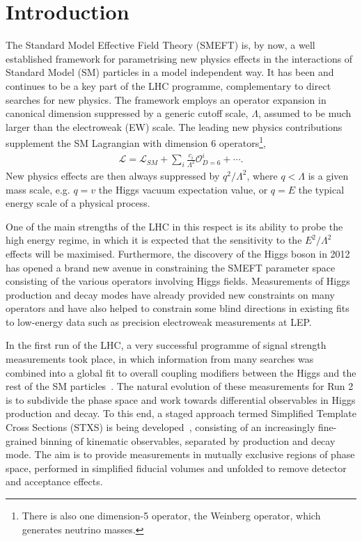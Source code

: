 \documentclass[11pt]{cernrep}
\begin{document}
\section{Introduction}
\label{sec:intro}
The Standard Model Effective Field Theory (SMEFT) is, by now, a well established framework for parametrising new physics effects in the interactions of Standard Model (SM) particles in a model independent way. It has been and continues to be a key part of the LHC programme, complementary to direct searches for new physics. The framework employs an operator expansion in canonical dimension suppressed by a generic cutoff scale, $\Lambda$, assumed to be much larger than the electroweak (EW) scale. The leading new physics contributions supplement the SM Lagrangian with dimension 6 operators\footnote{There is also one dimension-5 operator, the Weinberg operator, which generates neutrino masses.}, 
\begin{align}
    \mathcal{L}=\mathcal{L}_{SM}+\sum_i \frac{c_i}{\Lambda^2}\mathcal{O}^i_{D=6}+\cdots.
\end{align} 
New physics effects are then always suppressed by $q^2/\Lambda^2$, where $q<\Lambda$ is a given mass scale, e.g. $q=v$ the Higgs vacuum expectation value, or $q=E$ the typical energy scale of a physical process.

One of the main strengths of the LHC in this respect is its ability to probe the high energy regime, 
in which it is expected that the sensitivity to the $E^2/\Lambda^2$ effects will be maximised. Furthermore, the discovery of the Higgs boson in 2012~\cite{Aad:2012tfa,Chatrchyan:2012xdj} has opened a brand new avenue in constraining the SMEFT parameter space consisting of the various operators involving Higgs fields. Measurements of Higgs production and decay modes have already provided new constraints on many operators and have also helped to constrain some blind directions in existing fits to low-energy data such as precision electroweak measurements at LEP. 

In the first run of the LHC, a very successful programme of signal strength measurements took place, in which information from many searches was combined into a global fit to overall coupling modifiers between the Higgs and the rest of the SM particles~\cite{Khachatryan:2016vau}. The natural evolution of these measurements for Run 2 is to subdivide the phase space and work towards differential observables in Higgs production and decay. To this end, a staged approach termed Simplified Template Cross Sections (STXS) is being developed~\cite{deFlorian:2016spz}, consisting of an increasingly fine-grained binning of kinematic observables, separated by production and decay mode. The aim is to provide measurements in mutually exclusive regions of phase space, performed in simplified fiducial volumes and unfolded to remove detector and acceptance effects.
\end{document}
